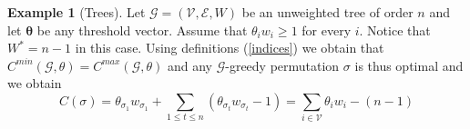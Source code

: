 \documentclass[12pt,twoside,reqno]{amsart}
\newtheorem{proposition}[theorem]{Proposition}
\theoremstyle{definition}
\newtheorem{example}[theorem]{Example}
\numberwithin{equation}{section}
\newcommand{\be}{\begin{equation}}
\newcommand{\ee}{\end{equation}}
\newcommand{\mc}{\mathcal}
\newcommand{\0}{\mathbf{0}}
\newcommand{\1}{\mathbf{1}}
\newcommand{\thre}{\theta}
\newcommand{\threabs}{\theta}
\newcommand{\Thre}{\mathbf{\theta}}
\newcommand{\we}{W^*}
\begin{document}
\begin{example}[Trees] Let $\mc G=(\mc V, \mc E, W)$ be an unweighted tree of order $n$ and let $\Thre$ be any threshold vector. Assume that $\thre_iw_i\geq 1$ for every $i$. 
Notice that  $\we=n-1$ in this case. Using definitions (\ref{indices}) we obtain that $C^{min}(\mc G,\threabs)=C^{max}(\mc G,\threabs)$ and any $\mc G$-greedy permutation $\sigma$ is thus optimal and we obtain
$$C(\sigma)=\thre_{\sigma_1}w_{\sigma_1}+\sum\limits_{1\le t\le n}(\thre_{\sigma_t}w_{\sigma_t}-1)=\sum\limits_{i\in\mc V}\thre_iw_i- (n-1)$$
\end{example}
%
%
\end{document}

